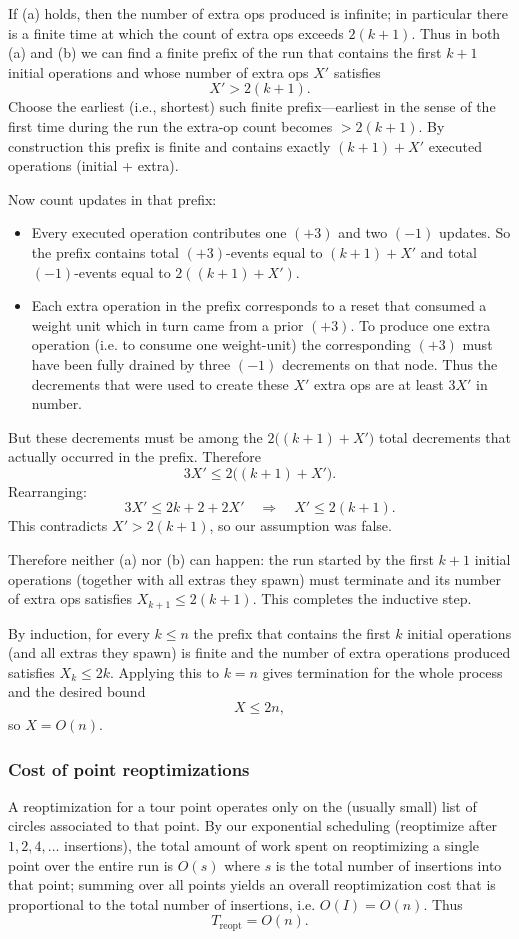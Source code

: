 \documentclass[11pt]{article}
\begin{document}
If (a) holds, then the number of extra ops produced is infinite; in particular there is a finite time at which the count of extra ops exceeds $2(k+1)$. Thus in both (a) and (b) we can find a finite prefix of the run that contains the first $k+1$ initial operations and whose number of extra ops $X'$ satisfies
\[
X' > 2(k+1).
\]
Choose the earliest (i.e., shortest) such finite prefix---earliest in the sense of the first time during the run the extra-op count becomes $>2(k+1)$. By construction this prefix is finite and contains exactly $(k+1)+X'$ executed operations (initial + extra).

Now count updates in that prefix:

\begin{itemize}
\item Every executed operation contributes one $(+3)$ and two $(-1)$ updates. So the prefix contains total $(+3)$-events equal to $(k+1)+X'$ and total $(-1)$-events equal to $2((k+1)+X')$.
\item Each extra operation in the prefix corresponds to a reset that consumed a weight unit which in turn came from a prior $(+3)$. To produce one extra operation (i.e. to consume one weight-unit) the corresponding $(+3)$ must have been fully drained by three $(-1)$ decrements on that node. Thus the decrements that were used to create these $X'$ extra ops are at least $3X'$ in number.
\end{itemize}

But these decrements must be among the $2\big((k+1)+X'\big)$ total decrements that actually occurred in the prefix. Therefore
\[
3X' \le 2\big((k+1)+X'\big).
\]
Rearranging:
\[
3X' \le 2k+2 + 2X' \quad\Longrightarrow\quad X' \le 2(k+1).
\]
This contradicts $X' > 2(k+1)$, so our assumption was false.

Therefore neither (a) nor (b) can happen: the run started by the first $k+1$ initial operations (together with all extras they spawn) must terminate and its number of extra ops satisfies $X_{k+1}\le 2(k+1)$. This completes the inductive step.

By induction, for every $k\le n$ the prefix that contains the first $k$ initial operations (and all extras they spawn) is finite and the number of extra operations produced satisfies $X_k\le 2k$. Applying this to $k=n$ gives termination for the whole process and the desired bound
\[
X \le 2n,
\]
so $X=O(n)$.

\subsubsection{Cost of point reoptimizations}
A reoptimization for a tour point operates only on the (usually small) list of circles associated to that point. By our exponential scheduling (reoptimize after $1,2,4,\dots$ insertions), the total amount of work spent on reoptimizing a single point over the entire run is $O(s)$ where $s$ is the total number of insertions into that point; summing over all points yields an overall reoptimization cost that is proportional to the total number of insertions, i.e. $O(I) = O(n)$. Thus
\[
T_{\text{reopt}} = O(n).
\]
\end{document}
